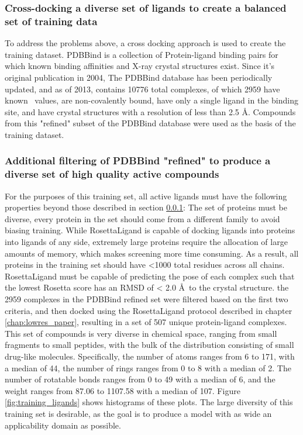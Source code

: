 \subsubsection{Cross-docking a diverse set of ligands to create a balanced set of training data}
\label{subsubsec:pdbbind_overview}
To address the problems above,  a cross docking approach is used to create the training dataset.
PDBBind\citep{Wang:2004cm} is a collection of Protein-ligand binding pairs for which known binding affinities and X-ray crystal structures exist.
Since it's original publication in 2004, The PDBBind database has been periodically updated, and as of 2013, contains 10776 total complexes, of which 2959 have known \ki\ values, are non-covalently bound, have only a single ligand in the binding site,  and have crystal structures with a resolution of less than 2.5 \AA.
Compounds from this "refined" subset of the PDBBind database were used as the basis of the training dataset.

\subsubsection{Additional filtering of PDBBind "refined" to produce a diverse set of high quality active compounds}
\label{subsubsec:active_poses}
For the purposes of this training set, all active ligands must have the following properties beyond those described in section \ref{subsubsec:pdbbind_overview}:
The set of proteins must be diverse, every protein in the set should come from a different family to avoid biasing training.
While RosettaLigand is capable of docking ligands into proteins into ligands of any side, extremely large proteins require the allocation of large amounts of memory, which makes screening more time consuming.
As a result, all proteins in the training set should have <1000 total residues across all chains.
RosettaLigand must be capable of predicting the pose of each complex such that the lowest Rosetta score has an RMSD of < 2.0 \AA\ to the crystal structure.
the 2959 complexes in the PDBBind refined set were filtered based on the first two criteria, and then docked using the RosettaLigand protocol described in chapter \ref{chap:lowres_paper}, resulting in a set of 507 unique protein-ligand complexes. 
This set of compounds is very diverse in chemical space, ranging from small fragments to small peptides, with the bulk of the distribution consisting of small drug-like molecules.
Specifically, the number of atoms ranges from 6 to 171, with a median of 44, the number of rings ranges from 0 to 8 with a median of 2. The number of rotatable bonds ranges from 0 to 49 with a median of 6, and the weight ranges from 87.06 to 1107.58 with a median of 107.
Figure \ref{fig:training_ligands} shows histograms of these plots.
The large diversity of this training set is desirable, as the goal is to produce a model with as wide an applicability domain as possible.

